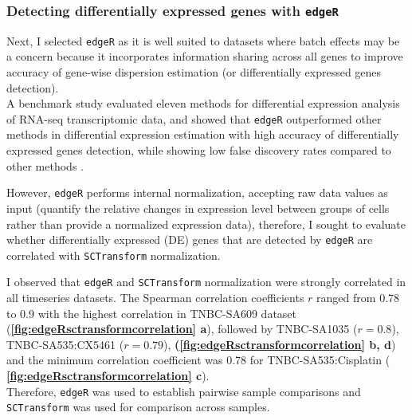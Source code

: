 
\subsubsection{Detecting differentially expressed genes with \texttt{edgeR}}

Next, I selected \texttt{edgeR} as it is well suited to datasets where batch effects may be a concern because it incorporates information sharing across all genes to improve accuracy of gene-wise dispersion estimation (or differentially expressed genes detection).
\\
A benchmark study evaluated eleven methods for differential expression analysis of RNA-seq transcriptomic data, and showed that \texttt{edgeR} outperformed other methods in differential expression estimation with high accuracy of differentially expressed genes detection, while showing low false discovery rates compared to other methods \cite{soneson2013comparison}. 

However, \texttt{edgeR} performs internal normalization, accepting raw data values as input (quantify the relative changes in expression level between groups of cells rather than provide a normalized expression data), therefore, I sought to evaluate whether differentially expressed (DE) genes that are detected by \texttt{edgeR} are correlated with \texttt{SCTransform} normalization. 


I observed that \texttt{edgeR} and \texttt{SCTransform} normalization were strongly correlated in all timeseries datasets. The Spearman correlation coefficients $r$ ranged from 0.78 to 0.9 with the highest correlation in TNBC-SA609 dataset  (\textbf{\autoref{fig:edgeRsctransformcorrelation} a}), followed by TNBC-SA1035 ($r=0.8$),  TNBC-SA535:CX5461 ($r=0.79$),   \textbf{(\autoref{fig:edgeRsctransformcorrelation} b, d}) and the minimum correlation coefficient was 0.78 for TNBC-SA535:Cisplatin ( \textbf{\autoref{fig:edgeRsctransformcorrelation} c}).
\\
Therefore, \texttt{edgeR} was used to establish pairwise sample comparisons and \texttt{SCTransform} was used for comparison across samples.



